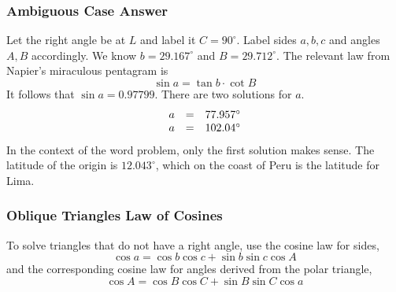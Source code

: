 \documentclass[xcolor=dvipsnames]{beamer}
\begin{document}
\begin{frame}
  \frametitle{Ambiguous Case Answer}
Let the right angle be at $L$ and label it $C=90^{\circ}$. Label sides
$a,b,c$ and angles $A,B$ accordingly. We know $b=29.167^{\circ}$ and
$B=29.712^{\circ}$. The relevant law from Napier's miraculous
pentagram is
\begin{equation}
  \label{eq:saavooba}
  \sin{}a=\tan{}b\cdot\cot{}B
\end{equation}
It follows that $\sin{}a=0.97799$. There are two solutions for $a$.
\begin{equation}
  \label{eq:oongiemi}
  \begin{array}{rcl}
    a&=&77.957^{\circ} \\
    a&=&102.04^{\circ}
  \end{array}\notag
\end{equation}
In the context of the word problem, only the first solution makes
sense. The latitude of the origin is $12.043^{\circ}$, which on the
coast of Peru is the latitude for Lima.
\end{frame}

\begin{frame}
  \frametitle{Oblique Triangles Law of Cosines}
To solve triangles that do not have a right angle, use the cosine law
for sides,
\begin{equation}
  \label{eq:epheepee}
  \cos{}a=\cos{}b\cos{}c+\sin{}b\sin{}c\cos{}A
\end{equation}
and the corresponding cosine law for angles derived from the polar
triangle,
\begin{equation}
  \label{eq:dijeeghe}
  \cos{}A=\cos{}B\cos{}C+\sin{}B\sin{}C\cos{}a
\end{equation}
\end{frame}
\end{document}
